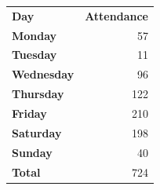 \documentclass{article}
\begin{document}
	\begin{center}
		\begin{tabular}{>{\columncolor{blue}\color{white}\bfseries}lr}
			\rowcolor[gray]{0.8}
			\color{black} Day & \bfseries Attendance\\[2pt]
			Monday & 57\\ Tuesday & 11\\ Wednesday & 96\\ Thursday & 122\\
			Friday & 210\\ Saturday & 198\\ Sunday & 40\\
			\cellcolor[gray]{0.8}\color{black}Total & 724
		\end{tabular}
	\end{center}
\end{document}
